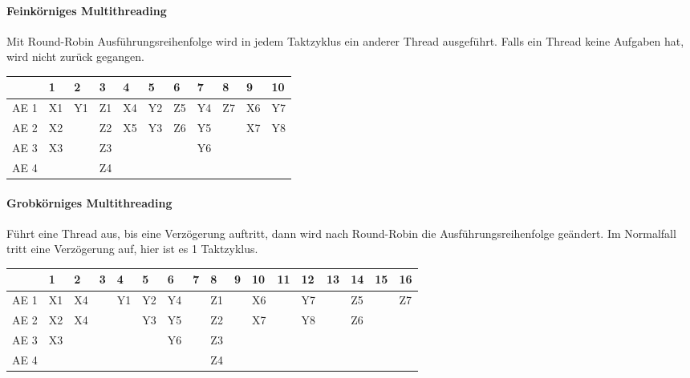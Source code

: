 \paragraph{Feinkörniges Multithreading} Mit Round-Robin Ausführungsreihenfolge wird in jedem
Taktzyklus ein anderer Thread ausgeführt. Falls ein Thread keine Aufgaben hat, wird nicht
zurück gegangen.\par
\begingroup\setlength\tabcolsep{2pt}
\begin{tabular}{|c|llllllllll|}\hline
     & 1 & 2 & 3 & 4 & 5 & 6 & 7 & 8 & 9 & 10\\\hline
AE 1 & X1 & Y1 & Z1 & X4 & Y2 & Z5 & Y4 & Z7 & X6 & Y7\\
AE 2 & X2 &    & Z2 & X5 & Y3 & Z6 & Y5 &    & X7 & Y8\\
AE 3 & X3 &    & Z3 &    &    &    & Y6 &    &    &   \\
AE 4 &    &    & Z4 &    &    &    &    &    &    &   \\\hline
\end{tabular}
\endgroup

\paragraph{Grobkörniges Multithreading} Führt eine Thread aus, bis eine Verzögerung auftritt, dann
wird nach Round-Robin die Ausführungsreihenfolge geändert. Im Normalfall tritt eine Verzögerung auf,
hier ist es 1 Taktzyklus.\par
\begingroup\setlength\tabcolsep{2pt}
\begin{tabular}{|c|llllllllllllllll|}\hline
     & 1 & 2 & 3 & 4 & 5 & 6 & 7 & 8 & 9 & 10 & 11 & 12 & 13 & 14 & 15 & 16 \\\hline
AE 1 & X1 & X4 &   & Y1 & Y2 & Y4 &   & Z1 &   & X6 &   & Y7 &   & Z5 &   & Z7 \\
AE 2 & X2 & X4 &   &    & Y3 & Y5 &   & Z2 &   & X7 &   & Y8 &   & Z6 &   &    \\
AE 3 & X3 &    &   &    &    & Y6 &   & Z3 &   &    &   &    &   &    &   &    \\
AE 4 &    &    &   &    &    &    &   & Z4 &   &    &   &    &   &    &   &    \\\hline
\end{tabular}
\endgroup

